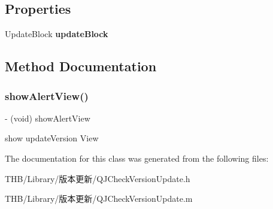 \subsection*{Properties}
\begin{DoxyCompactItemize}
\item 
\mbox{\label{interface_q_j_check_version_update_a2365b637d63fb58a15df9dc8f4c3581c}} 
Update\+Block {\bfseries update\+Block}
\end{DoxyCompactItemize}


\subsection{Method Documentation}
\mbox{\label{interface_q_j_check_version_update_af4b9a9a81fdbd0efc46c7d0fdb60c07f}} 
\subsubsection{\texorpdfstring{show\+Alert\+View()}{showAlertView()}}
{\footnotesize\ttfamily -\/ (void) show\+Alert\+View \begin{DoxyParamCaption}{ }\end{DoxyParamCaption}}

show update\+Version View 

The documentation for this class was generated from the following files\+:\begin{DoxyCompactItemize}
\item 
T\+H\+B/\+Library/版本更新/Q\+J\+Check\+Version\+Update.\+h\item 
T\+H\+B/\+Library/版本更新/Q\+J\+Check\+Version\+Update.\+m\end{DoxyCompactItemize}
